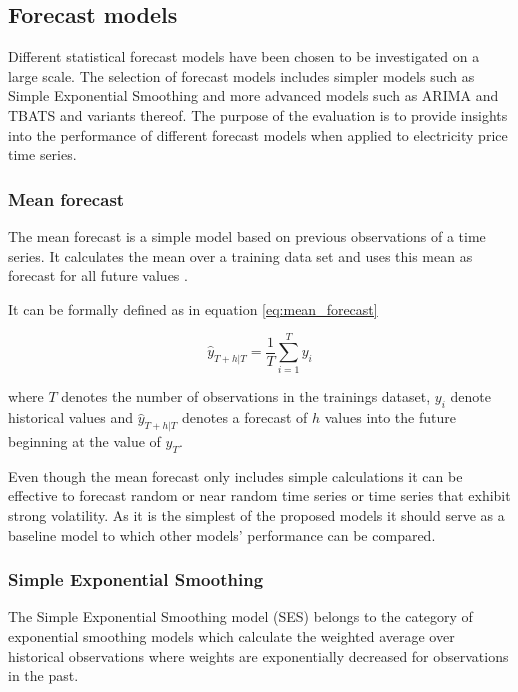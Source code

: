 \subsection{Forecast models}

Different statistical forecast models have been chosen to be investigated on a large scale. The selection of forecast models includes simpler models such as Simple Exponential Smoothing and more advanced models such as ARIMA and TBATS and variants thereof. The purpose of the evaluation is to provide insights into the performance of different forecast models when applied to electricity price time series. 

\subsubsection{Mean forecast}

The mean forecast is a simple model based on previous observations of a time series. It calculates the mean over a training data set and uses this mean as forecast for all future values \cite{hyndman2012forecasting}. 

It can be formally defined as in equation \ref{eq:mean_forecast}


\begin{equation}
\hat{y}_{T+h|T} = \frac{1}{T} \sum_{i=1}^T y_i
\label{eq:mean_forecast}
\end{equation}

where $T$ denotes the number of observations in the trainings dataset, $y_i$ denote historical values and $\hat{y}_{T+h|T}$ denotes a forecast of $h$ values into the future beginning at the value of $y_T$. 

Even though the mean forecast only includes simple calculations it can be effective to forecast random or near random time series or time series that exhibit strong volatility. As it is the simplest of the proposed models it should serve as a baseline model to which other models' performance can be compared. 

\subsubsection{Simple Exponential Smoothing}

The Simple Exponential Smoothing model (SES) belongs to the category of exponential smoothing models which calculate the weighted average over historical observations where weights are exponentially decreased for observations in the past. 

